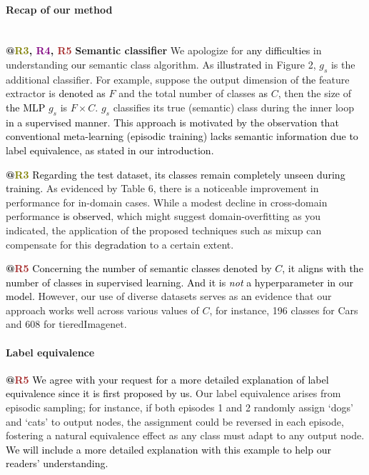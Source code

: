 \documentclass[letterpaper]{article} %
\newcommand{\nj}[1]{\textcolor{black}{#1}}
\newcommand{\yr}[1]{\textcolor{black}{#1}}
\newcommand{\rrr}[1]{\textcolor{olive}{#1}}
\newcommand{\rrrr}[1]{\textcolor{purple}{#1}}
\newcommand{\rrrrr}[1]{\textcolor{brown}{#1}}
\begin{document}
\paragraph{Recap of our method} \mbox{}\\
\textbf{@\rrr{R3}, \rrrr{R4}, \rrrrr{R5}} 
\textbf{Semantic classifier} 
We apologize for \nj{any difficulties} in understanding \nj{our} semantic class algorithm. As \yr{illustrated} in Figure 2,  $g_s$ is the additional classifier. For example, suppose the output dimension of \nj{the} feature extractor is \yr{denoted as} $F$ and the total number of classes \yr{as} $C$, then the size of \yr{the} \nj{MLP} $g_s$ is $F \times C$. $g_s$ classifies its true (semantic) class during the inner loop \nj{in a supervised manner}. 
\yr{This approach is motivated by the observation that conventional meta-learning (episodic training) lacks semantic information due to label equivalence, as stated in our introduction.} %

\noindent
\textbf{@\rrr{R3}} \yr{Regarding the test dataset, its classes remain completely unseen during training.} %
As evidenced by Table 6, there is a noticeable improvement in performance for in-domain cases. While a modest decline in cross-domain performance \yr{is observed}, which might suggest domain-overfitting as you indicated, the application of \nj{the} proposed techniques such as mixup can compensate for this \nj{degradation} to a certain extent.

\noindent
\textbf{@\rrrrr{R5}} \yr{Concerning the number of semantic classes denoted by $C$, it aligns with the number of classes in supervised learning. And it is \textit{not} a hyperparameter in our model.} %
However, our use of diverse datasets serves as \nj{an} evidence that our approach works well across various values of $C$, for instance, 196 classes for Cars and 608 for tieredImagenet.

\paragraph{Label equivalence} \textbf{@\rrrrr{R5}} 
\yr{We agree with your request for a more detailed explanation of label equivalence since it is \nj{first} proposed by us.} %
Our label equivalence arises from episodic sampling; for instance, if both episodes 1 and 2 randomly assign `dogs' and `cats' to output nodes, the assignment could be reversed in each episode, fostering a natural equivalence effect as any class must adapt to any output node. \yr{We will include a more detailed explanation with this example to help our readers' understanding.}
\end{document}
